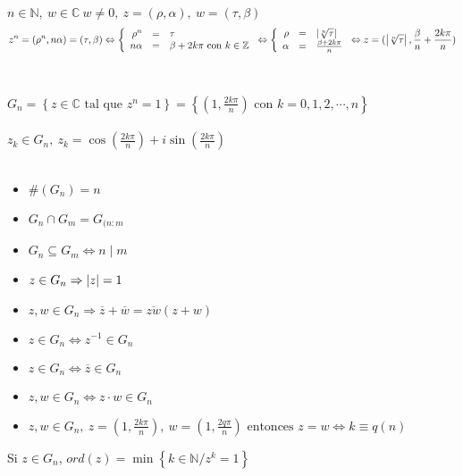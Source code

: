 \documentclass[a4paper,10pt]{article}
\begin{document}
 $n \in \mathbb{N}, \ w \in \mathbb{C} \ w \neq 0, \ z=(\rho,\alpha), \ w = (\tau,\beta)$
$$z^{n}=(\rho^{n},n \alpha) = (\tau,\beta) \Leftrightarrow
\left\{
\begin{array}{rcl}
    \rho^{n} & = & \tau
  \\ n \alpha & = & \beta + 2k\pi \mbox{ con } k \in \mathbb{Z}
\end{array}
\right. \Leftrightarrow
\left\{
\begin{array}{rcl}
    \rho & = & \left\lvert\sqrt[n]{\tau}\right\rvert
  \\ \alpha & = & \frac {\beta + 2k\pi} {n}
\end{array}
\right. \Leftrightarrow z = (\left\lvert\sqrt[n]{\tau}\right\rvert,\frac {\beta} {n} + \frac {2k\pi} {n})
$$ \\ \\

 $G_n = \left\lbrace z \in \mathbb{C} \mbox{ tal que } z^{n}=1 \right\rbrace = \left\lbrace (1,\frac{2k\pi} {n}) \mbox{ con } k = 0,1,2,\cdots,n \right\rbrace$ \\ \\

\notacion $z_k \in G_n, \ z_k = \cos (\frac{2k\pi}{n}) + i\sin (\frac{2k\pi}{n})$ \\ \\

\propiedades 
\begin{itemize}
	\item $\#(G_n) = n$
	\item $G_{n} \cap G_{m} = G_{(n:m}$
	\item $G_{n} \subseteq G_{m} \Leftrightarrow n \mid m$ 
	\item $z \in G_n \Rightarrow \left\lvert z\right\rvert = 1$
	\item $z,w \in G_n \Rightarrow \overline{z}+\overline{w}=\overline{zw}(z+w)$
	\item $z \in G_n \Leftrightarrow z^{-1} \in G_n$
	\item $z \in G_n \Leftrightarrow \overline{z} \in G_n$
	\item $z,w \in G_n \Leftrightarrow z \cdot w \in G_n$
	\item $z,w \in G_n, \ z=(1,\frac{2k\pi}{n}), \ w=(1,\frac{2q\pi}{n}) \mbox{ entonces } z=w \Leftrightarrow k \equiv q (n)$
\end{itemize}

 Si $z \in G_n$, $ord(z)=\min \left\lbrace k \in \mathbb{N} / z^{k}=1 \right\rbrace$ \\ \\
\end{document}
